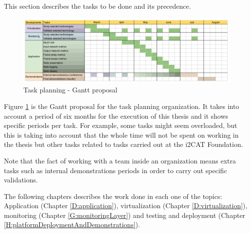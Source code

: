 This section describes the tasks to be done and its precedence. 

\begin{figure}[!htb]
\begin{center}
\includegraphics[width=1\textwidth]{./images/gantt.png}
\caption{Task planning - Gantt proposal}
\label{F:tpgp}
\end{center}
\end{figure}

Figure \ref{F:tpgp} is the Gantt proposal for the task planning organization. It takes into account a period of six months for the execution of this thesis and it shows specific periods per task. For example, some tasks might seem overloaded, but this is taking into account that the whole time will not be spent on working in the thesis but other tasks related to tasks carried out at the i2CAT Foundation.

Note that the fact of working with a team inside an organization means extra tasks such as internal demonstrations periods in order to carry out specific validations. 

The following chapters describes the work done in each one of the topics: Application (Chapter \ref{D:application}), virtualization (Chapter \ref{D:virtualization}), monitoring (Chapter \ref{G:monitoringLayer}) and testing and deployment (Chapter \ref{H:platformDeploymentAndDemonstrations}). 
